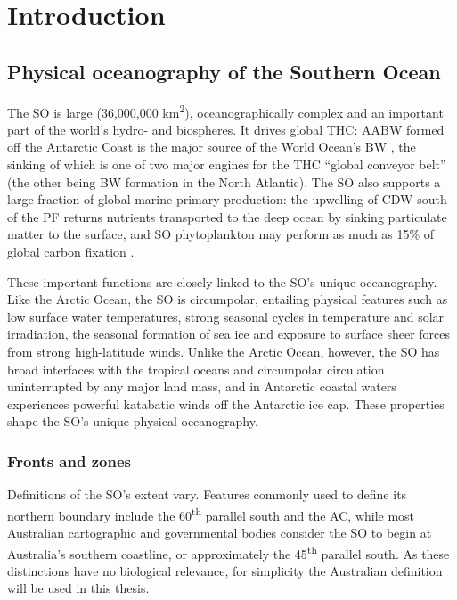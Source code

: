 \chapter{Introduction} 
\label{ch:intro}


\section{Physical oceanography of the Southern Ocean}

The \ac{SO} is large (\textapprox{}36,000,000 km\textsuperscript{2}), oceanographically complex and an important part of the world's hydro- and biospheres.
It drives global \ac{THC}: \ac{AABW} formed off the Antarctic Coast is the major source of the World Ocean's \ac{BW} \cite{Jacobs:2004hv}, the sinking of which is one of two major engines for the \ac{THC} ``global conveyor belt'' (the other being \ac{BW} formation in the North Atlantic).
The \ac{SO} also supports a large fraction of global marine primary production: the upwelling of \ac{CDW} south of the \ac{PF} returns nutrients transported to the deep ocean by sinking particulate matter \cite{Rath:1998wm} to the surface, and \ac{SO} phytoplankton may perform as much as 15\% of global carbon fixation \cite{Huntley:1991tg}.

These important functions are closely linked to the \ac{SO}'s unique oceanography.
Like the Arctic Ocean, the \ac{SO} is circumpolar, entailing physical features such as low surface water temperatures, strong seasonal cycles in temperature and solar irradiation, the seasonal formation of sea ice and exposure to surface sheer forces from strong high-latitude winds.
Unlike the Arctic Ocean, however, the \ac{SO} has broad interfaces with the tropical oceans and circumpolar circulation uninterrupted by any major land mass, and in Antarctic coastal waters experiences powerful katabatic winds off the Antarctic ice cap.
These properties shape the \ac{SO}'s unique physical oceanography.

\subsection{Fronts and zones}



Definitions of the \ac{SO}'s extent vary.
Features commonly used to define its northern boundary include the 60\textsuperscript{th} parallel south and the \ac{AC}, while most Australian cartographic and governmental bodies consider the \ac{SO} to begin at Australia's southern coastline, or approximately the 45\textsuperscript{th} parallel south.
As these distinctions have no biological relevance, for simplicity the Australian definition will be used in this thesis.

